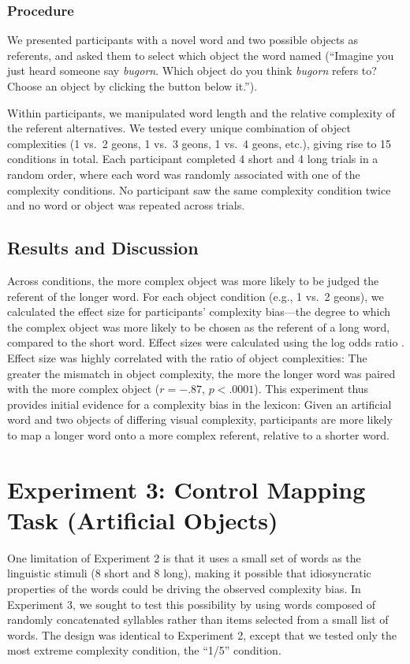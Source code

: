 \documentclass[man]{apa2}
\begin{document}
\subsubsection{Procedure}

We presented participants with a novel word and two possible objects as referents, and asked them to select which object the word named (``Imagine you just heard someone say {\it bugorn}. Which object do you think {\it bugorn} refers to? Choose an object by clicking the button below it.'').

Within participants, we manipulated word length and the relative complexity of the referent alternatives. We tested every unique combination of object complexities (1 vs.\ 2 geons, 1 vs.\ 3 geons, 1 vs.\ 4 geons, etc.), giving rise to 15 conditions in total. Each participant completed 4 short and 4 long trials in a random order, where each word was randomly associated with one of the complexity conditions. No participant saw the same complexity condition twice and no word or object was repeated across trials.

\subsection{Results and Discussion}
Across conditions, the more complex object was more likely to be judged the referent of the longer word. For each object condition (e.g., 1 vs.\ 2 geons), we calculated the effect size for participants' complexity bias---the degree to which the complex object was more likely to be chosen as the referent of a long word, compared to the short word. Effect sizes were calculated using the log odds ratio \cite{sanchez2003effect}. Effect size was highly correlated with the ratio of object complexities: The greater the mismatch in object complexity, the more the longer word was paired with the more complex object ($r = -.87$, $p < .0001$). This experiment thus provides initial evidence for a complexity bias in the lexicon: Given an artificial word and two objects of differing visual complexity, participants are more likely to map a longer word onto a more complex referent, relative to a shorter word.


\section{Experiment 3: Control Mapping Task (Artificial Objects)}
One limitation of Experiment 2 is that it uses a small set of words as the linguistic stimuli (8 short and 8 long), making it possible that idiosyncratic properties of the words could be driving the observed complexity bias. In Experiment 3, we sought to test this possibility by using words composed of randomly concatenated syllables rather than items selected from a small list of words. The design was identical to Experiment 2, except that we tested only the most extreme complexity condition, the ``1/5'' condition.
\end{document}

